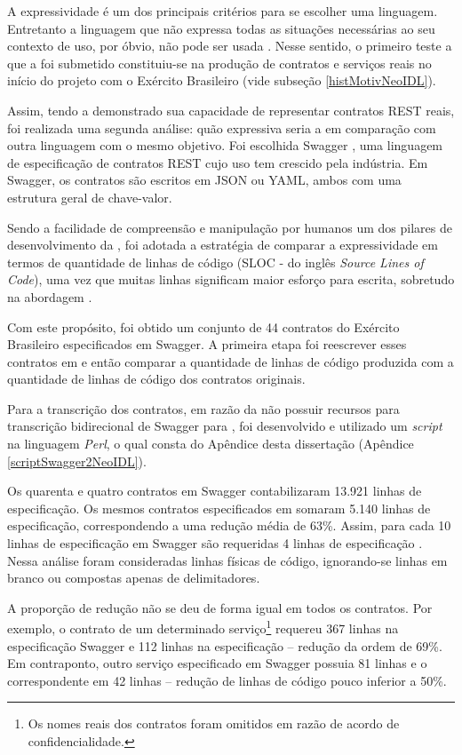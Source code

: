 A expressividade é um dos principais critérios para se escolher uma
linguagem. Entretanto a linguagem que não expressa todas as situações
necessárias ao seu contexto de uso, por óbvio, não pode ser usada
\cite{mackinlay1985expressiveness}. Nesse sentido, o primeiro teste a que a
\neoidl{} foi submetido constituiu-se na produção de contratos e serviços reais
no início do projeto com o Exército Brasileiro (vide subseção \ref{histMotivNeoIDL}).

Assim, tendo a \neoidl{} demonstrado sua capacidade de representar contratos
REST reais, foi realizada uma segunda análise: quão expressiva seria a
\neoidl{} em comparação com outra linguagem com o mesmo objetivo. Foi escolhida
Swagger \cite{swaggerSite}, uma linguagem de especificação de contratos REST
cujo uso tem crescido pela indústria.
Em Swagger, os contratos são escritos em JSON\cite{JSon} ou YAML\cite{YAML},
ambos com uma estrutura geral de chave-valor.

Sendo a facilidade de compreensão e manipulação por humanos um dos pilares
de desenvolvimento da \neoidl{}, foi adotada a estratégia de comparar a
expressividade em termos de quantidade de linhas de código (SLOC - do inglês
\textit{Source Lines of Code}), uma vez que muitas linhas significam maior
esforço para escrita, sobretudo na abordagem \CtFirst{}.

Com este propósito, foi obtido um conjunto de 44 contratos do Exército
Brasileiro especificados em Swagger. A primeira etapa foi reescrever esses
contratos em \neoidl{} e então comparar a quantidade de linhas de código
produzida com a quantidade de linhas de código dos contratos originais.

Para a
transcrição dos contratos, em razão da \neoidl{} não possuir recursos para
transcrição bidirecional de Swagger para \neoidl{}, foi desenvolvido
e utilizado um \textit{script} na linguagem \textit{Perl}, 
o qual consta do Apêndice desta dissertação
(Apêndice \ref{scriptSwagger2NeoIDL}).

Os quarenta e quatro contratos em Swagger contabilizaram 13.921 linhas de
especificação. Os mesmos contratos especificados em \neoidl{} somaram 5.140
linhas de especificação, correspondendo a uma redução média de 63\%. Assim, para
cada 10 linhas de especificação em Swagger são requeridas 4 linhas de
especificação \neoidl{}. Nessa análise foram consideradas linhas físicas de
código, ignorando-se linhas em branco ou compostas apenas de delimitadores.

A proporção de redução não se deu de forma igual em todos os contratos. Por
exemplo, o contrato de um determinado serviço\footnote{Os nomes reais dos
contratos foram omitidos em razão de acordo de confidencialidade.} requereu 367
linhas na especificação Swagger e 112 linhas na especificação \neoidl{} --
redução da ordem de 69\%.
Em contraponto, outro serviço especificado em Swagger possuia 81 linhas e o
correspondente em \neoidl{} 42 linhas -- redução de linhas de código pouco inferior a 50\%.

